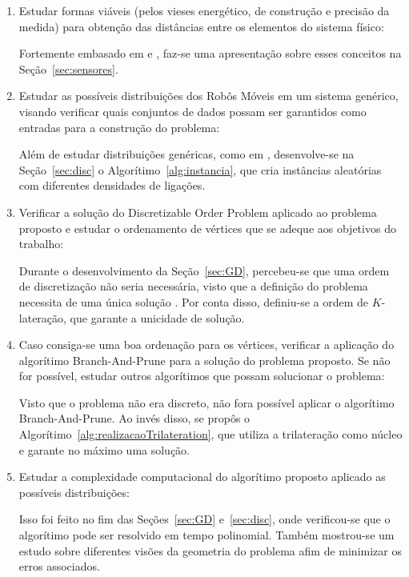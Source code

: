 \documentclass[a4paper,12pt]{report}
\begin{document}
	\begin{enumerate}
		
		\item Estudar formas viáveis (pelos vieses energético, de construção e precisão da medida) para obtenção das distâncias entre os elementos do sistema físico:
		
		Fortemente embasado em \cite{savvides2001dynamic} e \cite{sensorsForMobileRobots}, faz-se uma apresentação sobre esses conceitos na Seção~\ref{sec:sensores}. 
		
		\item Estudar as possíveis distribuições dos Robôs Móveis em um sistema genérico, visando verificar quais conjuntos de dados possam ser garantidos como entradas para a construção do problema:
		
		Além de estudar distribuições genéricas, como em \cite{eren2004rigidity}, desenvolve-se na Seção~\ref{sec:disc} o Algorítimo~\ref{alg:instancia}, que cria instâncias aleatórias com diferentes densidades de ligações.
		
		\item Verificar a solução do Discretizable Order Problem \cite{carlileGDandAplications} aplicado ao problema proposto e estudar o ordenamento de vértices que se adeque aos objetivos do trabalho:
		
		Durante o desenvolvimento da Seção~\ref{sec:GD}, percebeu-se que uma ordem de discretização não seria necessária, visto que a definição do problema necessita de uma única solução \cite{libertiEDG}. Por conta disso, definiu-se a ordem de $K$-lateração, que garante a unicidade de solução.
		
		\item Caso consiga-se uma boa ordenação para os vértices, verificar a aplicação do algorítimo Branch-And-Prune \cite{carlile:BP} para a solução do problema proposto. Se não for possível, estudar outros algorítimos que possam solucionar o problema:
		
		Visto que o problema não era discreto, não fora possível aplicar o algorítimo Branch-And-Prune. Ao invés disso, se propôs o Algorítimo~\ref{alg:realizacaoTrilateration}, que utiliza a trilateração como núcleo e garante no máximo uma solução.
		
		\item Estudar a complexidade computacional do algorítimo proposto aplicado as possíveis distribuições:
		
		Isso foi feito no fim das Seções~\ref{sec:GD} e~\ref{sec:disc}, onde verificou-se que o algorítimo pode ser resolvido em tempo polinomial. Também mostrou-se um estudo sobre diferentes visões da geometria do problema afim de minimizar os erros associados. 
		

\end{enumerate}
\end{document}
